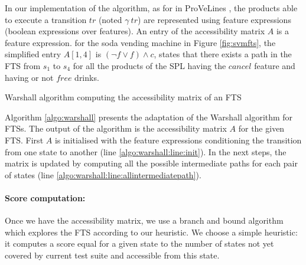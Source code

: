 In our implementation of the algorithm, as for in ProVeLines \cite{Cordy2013}, the products able to execute a transition $tr$ (noted $\gamma\ tr$) are represented using feature expressions (\ie boolean expressions over features). An entry of the accessibility matrix $A$ is a feature expression. \Eg for the soda vending machine in Figure \ref{fig:svmfts}, the simplified entry $A[1,4]$ is $(\neg f \vee f) \wedge c$, states that there exists a path in the FTS from $s_1$ to $s_4$ for all the products of the SPL having the $cancel$ feature and having or not $free$ drinks.

\begin{algorithm}
 \caption{Warshall algorithm computing the accessibility matrix of an FTS}
 \label{algo:warshall}
\end{algorithm}

Algorithm \ref{algo:warshall} presents the adaptation of the Warshall algorithm for FTSs. The output of the algorithm is the accessibility matrix $A$ for the given FTS. First $A$ is initialised with the feature expressions conditioning the transition from one state to another (line \ref{algo:warshall:line:init}). In the next steps, the matrix is updated by computing all the possible intermediate paths for each pair of states (line \ref{algo:warshall:line:allintermediatepath}). 

\paragraph{Score computation:}

Once we have the accessibility matrix, we use a branch and bound algorithm which explores the FTS according to our heuristic. We choose a simple heuristic: it computes a score equal for a given state to the number of states not yet covered by current test suite and accessible from this state. 

